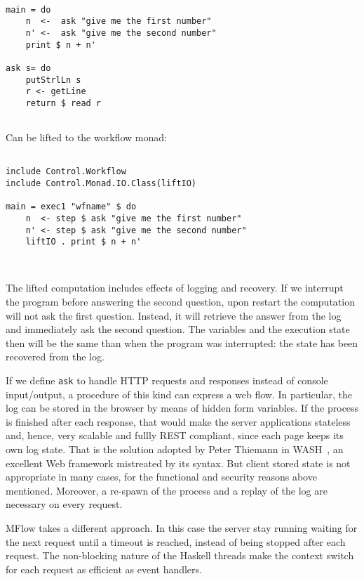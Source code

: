\documentclass{tmr}
\begin{document}
{\tt 
 
\begin{verbatim} 
 
main = do 
    n  <-  ask "give me the first number" 
    n' <-  ask "give me the second number" 
    print $ n + n' 
 
ask s= do 
    putStrlLn s 
    r <- getLine 
    return $ read r 
 
\end{verbatim} 
 
} 
 
Can be lifted to the workflow monad: 
 
{\tt 
 
\begin{verbatim} 
 
include Control.Workflow 
include Control.Monad.IO.Class(liftIO) 
 
main = exec1 "wfname" $ do 
    n  <- step $ ask "give me the first number" 
    n' <- step $ ask "give me the second number" 
    liftIO . print $ n + n' 
 
 
\end{verbatim} 
 
} 
 
The lifted computation includes effects of logging and recovery. If we interrupt the program before answering the second question, upon restart the computation will not ask the first question. Instead, it will retrieve the answer from the log and immediately ask the second question. The variables and the execution state then will be the same than when the program was interrupted: the state has been recovered from the log. 
 
If we define {\tt ask} to handle HTTP requests and responses instead of console input/output, a procedure of this kind can express a web flow. 
In particular, the log can be stored in the browser by means of hidden form 
variables. If the process is finished after each response, that would make the server applications stateless and, hence, very scalable and fullly REST compliant, since each page keeps its own log state. That is the solution adopted by Peter Thiemann in WASH~\cite{auth:wash}, an excellent Web framework mistreated by its syntax. But client stored state is not appropriate in many cases, for the functional and security reasons above mentioned. Moreover, a re-spawn of the process and a replay of the log are necessary on every request. 
 
MFlow takes a different approach. In this case the server  stay running waiting for the next request until a timeout is reached,  instead of being stopped after each request. The non-blocking nature of the Haskell threads make the context switch for each request as efficient as event handlers. 
\end{document}
